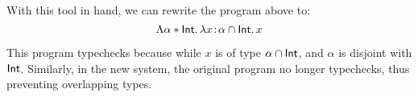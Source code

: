 With this tool in hand, we can rewrite the program above to:
\[
\Lambda \alpha * \textsf{Int}.\, \lambda x \!:\! \alpha \cap \textsf{Int}.\, x
\]

This program typechecks because while $x$ is of type $\alpha \cap \textsf{Int}$,
and $\alpha$ is disjoint with $\textsf{Int}$. Similarly, in the new system,
the original program no longer typechecks, thus preventing overlapping types.

